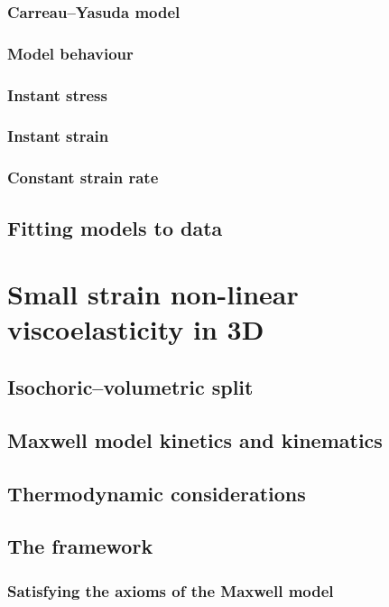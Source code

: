 \documentclass[12pt]{article}
\begin{document}
\subsubsection{Carreau--Yasuda model}

\subsubsection{Model behaviour}

\subsubsection*{Instant stress}
\subsubsection*{Instant strain}
\subsubsection*{Constant strain rate}


\subsection{Fitting models to data}

\section{Small strain non-linear viscoelasticity in 3D}

\subsection{Isochoric--volumetric split}

\subsection{Maxwell model kinetics and kinematics}

\subsection{Thermodynamic considerations}

\subsection{The framework \label{sec:frame-work-1d}}

\subsubsection{Satisfying the axioms of the Maxwell model}
\end{document}
